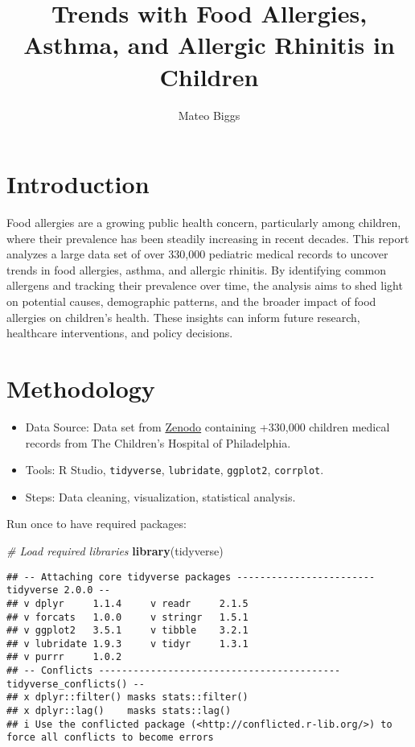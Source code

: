 \documentclass[
]{article}
\title{Trends with Food Allergies, Asthma, and Allergic Rhinitis in
Children}
\author{Mateo Biggs}
\date{}
\newenvironment{Shaded}{\begin{snugshade}}{\end{snugshade}}
\newcommand{\CommentTok}[1]{\textcolor[rgb]{0.56,0.35,0.01}{\textit{#1}}}
\newcommand{\FunctionTok}[1]{\textcolor[rgb]{0.13,0.29,0.53}{\textbf{#1}}}
\newcommand{\NormalTok}[1]{#1}
\providecommand{\tightlist}{%
  \setlength{\itemsep}{0pt}\setlength{\parskip}{0pt}}
\begin{document}
\maketitle

\section{Introduction}\label{introduction}

Food allergies are a growing public health concern, particularly among
children, where their prevalence has been steadily increasing in recent
decades. This report analyzes a large data set of over 330,000 pediatric
medical records to uncover trends in food allergies, asthma, and
allergic rhinitis. By identifying common allergens and tracking their
prevalence over time, the analysis aims to shed light on potential
causes, demographic patterns, and the broader impact of food allergies
on children's health. These insights can inform future research,
healthcare interventions, and policy decisions.

\section{Methodology}\label{methodology}

\begin{itemize}
\tightlist
\item
  Data Source: Data set from
  \href{https://zenodo.org/records/44529}{Zenodo} containing +330,000
  children medical records from The Children's Hospital of Philadelphia.
\item
  Tools: R Studio, \texttt{tidyverse}, \texttt{lubridate},
  \texttt{ggplot2}, \texttt{corrplot}.
\item
  Steps: Data cleaning, visualization, statistical analysis.
\end{itemize}

Run once to have required packages:

\begin{Shaded}
\begin{Highlighting}[]
\CommentTok{\# Load required libraries}
\FunctionTok{library}\NormalTok{(tidyverse)}
\end{Highlighting}
\end{Shaded}

\begin{verbatim}
## -- Attaching core tidyverse packages ------------------------ tidyverse 2.0.0 --
## v dplyr     1.1.4     v readr     2.1.5
## v forcats   1.0.0     v stringr   1.5.1
## v ggplot2   3.5.1     v tibble    3.2.1
## v lubridate 1.9.3     v tidyr     1.3.1
## v purrr     1.0.2     
## -- Conflicts ------------------------------------------ tidyverse_conflicts() --
## x dplyr::filter() masks stats::filter()
## x dplyr::lag()    masks stats::lag()
## i Use the conflicted package (<http://conflicted.r-lib.org/>) to force all conflicts to become errors
\end{verbatim}
\end{document}
